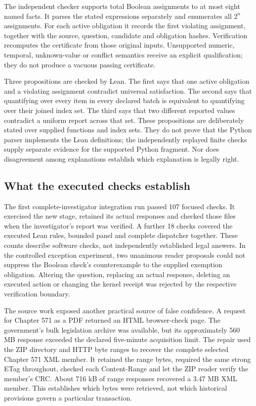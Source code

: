 The independent checker supports total Boolean assignments to at most eight
named facts. It parses the stated expressions separately and enumerates all
$2^n$ assignments. For each active obligation it records the first violating
assignment, together with the source, question, candidate and obligation hashes.
Verification recomputes the certificate from those original inputs. Unsupported
numeric, temporal, unknown-value or conflict semantics receive an explicit
qualification; they do not produce a vacuous passing certificate.

Three propositions are checked by Lean. The first says that one active
obligation and a violating assignment contradict universal satisfaction. The
second says that quantifying over every item in every declared batch is
equivalent to quantifying over their joined index set. The third says that two
different reported values contradict a uniform report across that set. These
propositions are deliberately stated over supplied functions and index sets.
They do not prove that the Python parser implements the Lean definitions; the
independently replayed finite checks supply separate evidence for the supported
Python fragment. Nor does disagreement among explanations establish which
explanation is legally right.

\subsection{What the executed checks establish}

The first complete-investigator integration run passed 107 focused checks.
It exercised the new stage, retained its actual responses and checked those
files when the investigator's report was verified. A further 18 checks covered
the executed Lean rules, bounded panel and complete dispatcher together. These
counts describe software checks, not independently established legal answers.
In the controlled exception experiment, two unanimous reader proposals could
not suppress the Boolean check's counterexample to the supplied exemption
obligation. Altering the question, replacing an actual response, deleting an
executed action or changing the kernel receipt was rejected by the respective
verification boundary.

The source work exposed another practical source of false confidence. A request
for Chapter 571 as a PDF returned an HTML browser-check page. The government's
bulk legislation archive was available, but its approximately 560 MB response
exceeded the declared five-minute acquisition limit. The repair used the ZIP
directory and HTTP byte ranges to recover the complete selected Chapter 571 XML
member. It retained the range bytes, required the same strong ETag throughout,
checked each Content-Range and let the ZIP reader verify the member's CRC.
About 716 kB of range responses recovered a 3.47 MB XML member. This establishes
which bytes were retrieved, not which historical provisions govern a particular
transaction.

